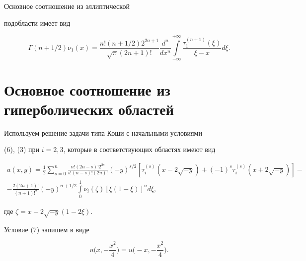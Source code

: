 \begin{lem}


Основное соотношение из эллиптической


подобласти имеет вид


\begin{equation}


\Gamma(n+1/2)\nu_1(x)=\frac{n!(n+1/2)2^{2n+1}}{\sqrt{\pi}(2n+1)!}


\frac{d^n}{dx^n}\int \limits^{+\infty}_{-\infty}


\frac{\tau_1^{(n+1)}(\xi)}{\xi-x}d\xi.


\end{equation}


\end{lem}





\section{Основное соотношение из гиперболических областей}





Используем решение задачи типа Коши с начальными условиями


(6), (3) при $ i=2,3$, которые в соответствующих областях имеют вид


\begin{multline}


u(x,y) = \frac{1}{2} \sum \limits_{s=0}^n \frac{n!(2n-s)!2^{2s}}


{s!(n-s)!(2n)!}(-y)^{s/2}[\tau_i^{(s)}(x-2\sqrt{-y})


+ (-1)^s\tau_i^{(s)}(x+2\sqrt{-y})] - \\


%


- \frac{2(2n+1)!}{(n+1)!^2}(-y)^{n+1/2}


\int \limits_0^1\nu_i(\zeta)[\xi(1-\xi)]^nd\xi,


\end{multline}


где $\zeta = x-2\sqrt{-y}(1-2\xi)$.





Условие (7) запишем в виде


\begin{equation}


u\bigg(x,-\frac{x^2}{4}\bigg) = u\bigg(-x,-\frac{x^2}{4}\bigg).


\end{equation}





